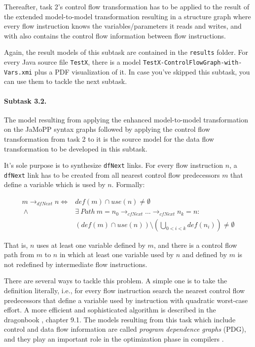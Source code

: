 \documentclass[11pt]{article}
\begin{document}
Thereafter, task 2's control flow transformation has to be applied to the
result of the extended model-to-model transformation resulting in a structure
graph where every flow instruction knows the variables/parameters it reads and
writes, and with also contains the control flow information between flow
instructions.

Again, the result models of this subtask are contained in the \verb|results|
folder.  For every Java source file \verb|TestX|, there is a model
\verb|TestX-ControlFlowGraph-with-Vars.xmi| plus a PDF visualization of it.  In
case you've skipped this subtask, you can use them to tackle the next subtask.


\paragraph{Subtask 3.2.}
\label{sec:subtask-3.2}

The model resulting from applying the enhanced model-to-model transformation on
the JaMoPP syntax graphs followed by applying the control flow transformation
from task 2 to it is the source model for the data flow transformation to be
developed in this subtask.

It's sole purpose is to synthesize \verb|dfNext| links.  For every flow
instruction $n$, a \verb|dfNext| link has to be created from all nearest
control flow predecessors $m$ that define a variable which is used by $n$.
Formally:

\begin{align*}
  m \rightarrow_{dfNext} n  \iff {} & def(m) \cap use(n) \neq \emptyset\\
  ~\land {} & \exists~Path~m = n_0 \rightarrow_{cfNext} ... \rightarrow_{cfNext} n_k = n:\\
  & \left(def(m) \cap use(n)\right) \setminus \left(\bigcup_{0 < i < k}
    def(n_i)\right) \neq \emptyset
\end{align*}

That is, $n$ uses at least one variable defined by $m$, and there is a control
flow path from $m$ to $n$ in which at least one variable used by $n$ and
defined by $m$ is not redefined by intermediate flow instructions.

There are several ways to tackle this problem.  A simple one is to take the
definition literally, i.e., for every flow instruction search the nearest
control flow predecessors that define a variable used by instruction with
quadratic worst-case effort.  A more efficient and sophisticated algorithm is
described in the dragonbook \cite{Aho:CPTT}, chapter 9.1.  The models resulting
from this task which include control and data flow information are called
\emph{program dependence graphs} (PDG), and they play an important role in the
optimization phase in compilers \cite{Ferrante:1987:PDG:24039.24041}.
\end{document}
